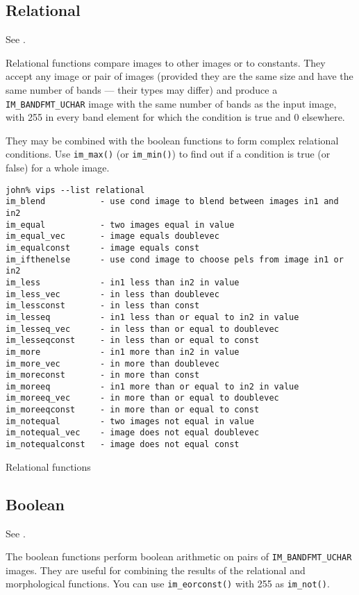 \subsection{Relational}

See .

Relational functions compare images to other images or to constants. They
accept any image or pair of images (provided they are the same size and
have the same number of bands --- their types may differ) and produce a
\verb+IM_BANDFMT_UCHAR+ image with the same number of bands as the input
image, with 255 in every band element for which the condition is true and
0 elsewhere.

They may be combined with the boolean functions to form complex relational
conditions. Use \verb+im_max()+ (or \verb+im_min()+) to find out if a
condition is true (or false) for a whole image.

\begin{fig2}
\begin{verbatim}
john% vips --list relational
im_blend           - use cond image to blend between images in1 and in2
im_equal           - two images equal in value
im_equal_vec       - image equals doublevec
im_equalconst      - image equals const
im_ifthenelse      - use cond image to choose pels from image in1 or in2
im_less            - in1 less than in2 in value
im_less_vec        - in less than doublevec
im_lessconst       - in less than const
im_lesseq          - in1 less than or equal to in2 in value
im_lesseq_vec      - in less than or equal to doublevec
im_lesseqconst     - in less than or equal to const
im_more            - in1 more than in2 in value
im_more_vec        - in more than doublevec
im_moreconst       - in more than const
im_moreeq          - in1 more than or equal to in2 in value
im_moreeq_vec      - in more than or equal to doublevec
im_moreeqconst     - in more than or equal to const
im_notequal        - two images not equal in value
im_notequal_vec    - image does not equal doublevec
im_notequalconst   - image does not equal const
\end{verbatim}
\caption{Relational functions}
\label{fg:relational}
\end{fig2}

\subsection{Boolean}

See .

The boolean functions perform boolean arithmetic on pairs of
\verb+IM_BANDFMT_UCHAR+ images. They are useful for combining the results of
the relational and morphological functions. You can use 
\verb+im_eorconst()+ with 255 as \verb+im_not()+.

